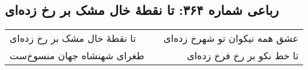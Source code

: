 \begin{center}
\section*{رباعی شماره ۳۶۴: تا نقطهٔ خال مشک بر رخ زده‌ای}
\label{sec:sh364}
\begin{longtable}{l p{0.5cm} r}
تا نقطهٔ خال مشک بر رخ زده‌ای
&&
عشق همه نیکوان تو شهرخ زده‌ای
\\
طغرای شهنشاه جهان منسوخ‌ست
&&
تا خط نکو بر رخ فرخ زده‌ای
\\
\end{longtable}
\end{center}
